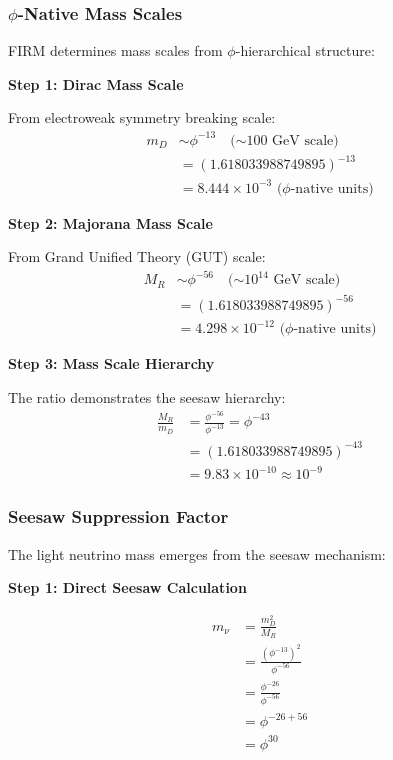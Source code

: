 \subsubsection{$\phi$-Native Mass Scales}

FIRM determines mass scales from $\phi$-hierarchical structure:

\textbf{Step 1: Dirac Mass Scale}

From electroweak symmetry breaking scale:
\begin{align}
m_D &\sim \phi^{-13} \quad \text{($\sim 100$ GeV scale)} \\
&= (1.618033988749895)^{-13} \\
&= 8.444 \times 10^{-3} \text{ ($\phi$-native units)}
\end{align}

\textbf{Step 2: Majorana Mass Scale}

From Grand Unified Theory (GUT) scale:
\begin{align}
M_R &\sim \phi^{-56} \quad \text{($\sim 10^{14}$ GeV scale)} \\
&= (1.618033988749895)^{-56} \\
&= 4.298 \times 10^{-12} \text{ ($\phi$-native units)}
\end{align}

\textbf{Step 3: Mass Scale Hierarchy}

The ratio demonstrates the seesaw hierarchy:
\begin{align}
\frac{M_R}{m_D} &= \frac{\phi^{-56}}{\phi^{-13}} = \phi^{-43} \\
&= (1.618033988749895)^{-43} \\
&= 9.83 \times 10^{-10} \approx 10^{-9}
\end{align}

\subsubsection{Seesaw Suppression Factor}

The light neutrino mass emerges from the seesaw mechanism:

\textbf{Step 1: Direct Seesaw Calculation}

\begin{align}
m_\nu &= \frac{m_D^2}{M_R} \\
&= \frac{(\phi^{-13})^2}{\phi^{-56}} \\
&= \frac{\phi^{-26}}{\phi^{-56}} \\
&= \phi^{-26+56} \\
&= \phi^{30}
\end{align}

